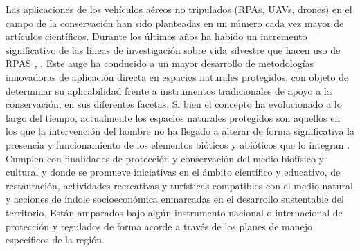 \documentclass[11pt,]{article}
\begin{document}
Las aplicaciones de los vehículos aéreos no tripulados (RPAs, UAVs,
drones) en el campo de la conservación han sido planteadas en un número
cada vez mayor de artículos científicos. Durante los últimos años ha
habido un incremento significativo de las líneas de investigación sobre
vida silvestre que hacen uso de RPAS \citep{Linchant2015},
\citep{Christie2016}. Este auge ha conducido a un mayor desarrollo de
metodologías innovadoras de aplicación directa en espacios naturales
protegidos, con objeto de determinar su aplicabilidad frente a
instrumentos tradicionales de apoyo a la conservación, en sus diferentes
facetas. Si bien el concepto ha evolucionado a lo largo del tiempo,
actualmente los espacios naturales protegidos son aquellos en los que la
intervención del hombre no ha llegado a alterar de forma significativa
la presencia y funcionamiento de los elementos bióticos y abióticos que
lo integran \citep{Bravo2008}. Cumplen con finalidades de protección y
conservación del medio biofísico y cultural y donde se promueve
iniciativas en el ámbito científico y educativo, de restauración,
actividades recreativas y turísticas compatibles con el medio natural y
acciones de índole socioeconómica enmarcadas en el desarrollo
sustentable del territorio. Están amparados bajo algún instrumento
nacional o internacional de protección y regulados de forma acorde a
través de los planes de manejo específicos de la región.
\end{document}
